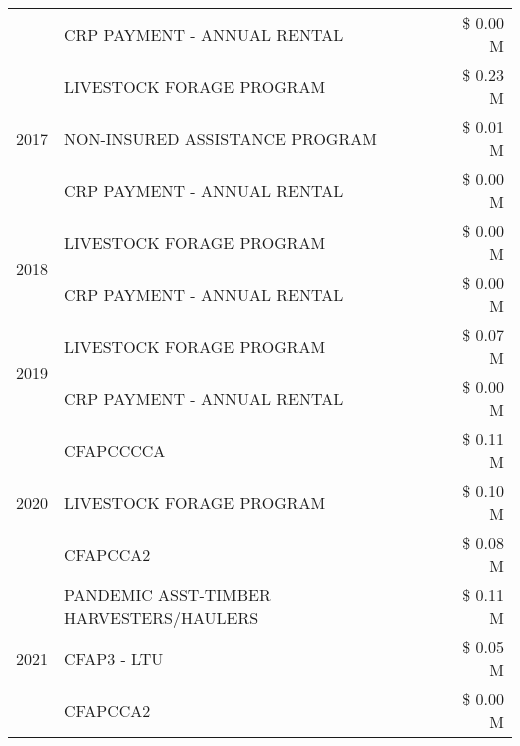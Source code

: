\begin{tabular}{llr}
 & CRP PAYMENT - ANNUAL RENTAL & \$ 0.00 M \\
\cline{1-3}
\multirow[t]{3}{*}{2017} & LIVESTOCK FORAGE PROGRAM & \$ 0.23 M \\
 & NON-INSURED ASSISTANCE PROGRAM & \$ 0.01 M \\
 & CRP PAYMENT - ANNUAL RENTAL & \$ 0.00 M \\
\cline{1-3}
\multirow[t]{2}{*}{2018} & LIVESTOCK FORAGE PROGRAM & \$ 0.00 M \\
 & CRP PAYMENT - ANNUAL RENTAL & \$ 0.00 M \\
\cline{1-3}
\multirow[t]{2}{*}{2019} & LIVESTOCK FORAGE PROGRAM & \$ 0.07 M \\
 & CRP PAYMENT - ANNUAL RENTAL & \$ 0.00 M \\
\cline{1-3}
\multirow[t]{3}{*}{2020} & CFAPCCCCA & \$ 0.11 M \\
 & LIVESTOCK FORAGE PROGRAM & \$ 0.10 M \\
 & CFAPCCA2 & \$ 0.08 M \\
\cline{1-3}
\multirow[t]{3}{*}{2021} & PANDEMIC ASST-TIMBER HARVESTERS/HAULERS & \$ 0.11 M \\
 & CFAP3 - LTU & \$ 0.05 M \\
 & CFAPCCA2 & \$ 0.00 M \\
\cline{1-3}
\bottomrule
\end{tabular}
